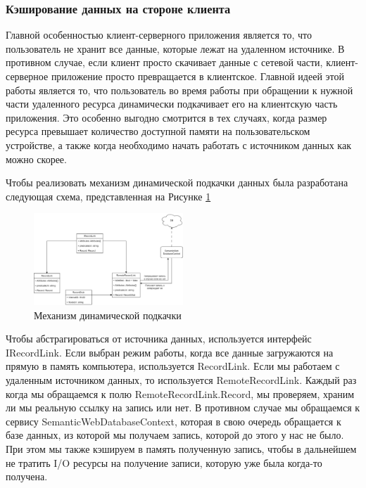 \documentclass[12pt]{article}
\begin{document}
\subsubsection{Кэширование данных на стороне клиента}
\qquad Главной особенностью клиент-серверного приложения является то, что пользователь не хранит все данные, которые лежат на удаленном источнике. В противном случае, если клиент просто скачивает данные с сетевой части, клиент-серверное приложение просто превращается в клиентское. Главной идеей этой работы является то, что пользователь во время работы при обращении к нужной части удаленного ресурса динамически подкачивает его на клиентскую часть приложения. Это особенно выгодно смотрится в тех случаях, когда размер ресурса превышает количество доступной памяти на пользовательском устройстве, а также когда необходимо начать работать с источником данных как можно скорее.

Чтобы реализовать механизм динамической подкачки данных была разработана следующая схема, представленная на Рисунке \ref{fig:remote_conn}

\begin{figure}[!ht]
    \centering
    \includegraphics[width=0.5\textwidth]{_images/remote_conn.png}
    \caption{Механизм динамической подкачки}
    \label{fig:remote_conn}
\end{figure}

Чтобы абстрагироваться от источника данных, используется интерфейс IRecordLink. Если выбран режим работы, когда все данные загружаются на прямую в память компьютера, используется RecordLink. Если мы работаем с удаленным источником данных, то используется RemoteRecordLink. Каждый раз когда мы обращаемся к полю RemoteRecordLink.Record, мы проверяем, храним ли мы реальную ссылку на запись или нет. В противном случае мы обращаемся к сервису SemanticWebDatabaseContext, которая в свою очередь обращается к базе данных, из которой мы получаем запись, которой до этого у нас не было. При этом мы также кэшируем в память полученную запись, чтобы в дальнейшем не тратить I/O ресурсы на получение записи, которую уже была когда-то получена.
\end{document}
